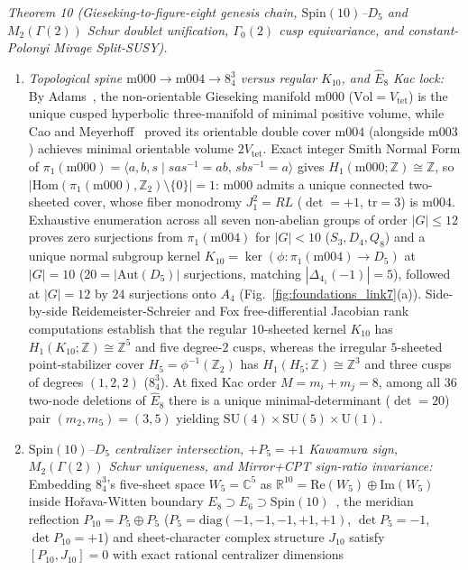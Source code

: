 \documentclass[aps,prd,twocolumn,nofootinbib,floatfix]{revtex4-2}
\begin{document}
\emph{Theorem 10 (Gieseking-to-figure-eight genesis chain, $\mathrm{Spin}(10)$--$D_5$ and $M_2(\Gamma(2))$ Schur doublet unification, $\Gamma_0(2)$ cusp equivariance, and constant-Polonyi Mirage Split-SUSY).}
\begin{enumerate}
    \item \emph{Topological spine $\mathrm{m000} \to \mathrm{m004} \to 8^3_4$ versus regular $K_{10}$, and $\widehat{E}_8$ Kac lock:} By Adams~\cite{Adams1987}, the non-orientable Gieseking manifold $\mathrm{m000}$ ($\mathrm{Vol} = V_{\mathrm{tet}}$) is the unique cusped hyperbolic three-manifold of minimal positive volume, while Cao and Meyerhoff~\cite{CaoMeyerhoff2001} proved its orientable double cover $\mathrm{m004}$ (alongside $\mathrm{m003}$) achieves minimal orientable volume $2V_{\mathrm{tet}}$. Exact integer Smith Normal Form of $\pi_1(\mathrm{m000}) = \langle a,b,s \mid sas^{-1}=ab,\,sbs^{-1}=a\rangle$ gives $H_1(\mathrm{m000};\mathbb{Z}) \cong \mathbb{Z}$, so $|\mathrm{Hom}(\pi_1(\mathrm{m000}),\mathbb{Z}_2)\setminus\{0\}| = 1$: $\mathrm{m000}$ admits a unique connected two-sheeted cover, whose fiber monodromy $J_1^2 = RL$ ($\det = +1$, $\mathrm{tr} = 3$) is $\mathrm{m004}$. Exhaustive enumeration across all seven non-abelian groups of order $|G| \le 12$ proves zero surjections from $\pi_1(\mathrm{m004})$ for $|G| < 10$ ($S_3, D_4, Q_8$) and a unique normal subgroup kernel $K_{10} = \ker(\phi: \pi_1(\mathrm{m004}) \to D_5)$ at $|G| = 10$ ($20 = |\mathrm{Aut}(D_5)|$ surjections, matching $|\Delta_{4_1}(-1)| = 5$), followed at $|G| = 12$ by $24$ surjections onto $A_4$ (Fig.~\ref{fig:foundations_link7}(a)). Side-by-side Reidemeister-Schreier and Fox free-differential Jacobian rank computations establish that the regular $10$-sheeted kernel $K_{10}$ has $H_1(K_{10};\mathbb{Z}) \cong \mathbb{Z}^5$ and five degree-$2$ cusps, whereas the irregular $5$-sheeted point-stabilizer cover $H_5 = \phi^{-1}(\mathbb{Z}_2)$ has $H_1(H_5;\mathbb{Z}) \cong \mathbb{Z}^3$ and three cusps of degrees $(1,2,2)$ ($8^3_4$). At fixed Kac order $M = m_i + m_j = 8$, among all $36$ two-node deletions of $\widehat{E}_8$ there is a unique minimal-determinant ($\det = 20$) pair $(m_2, m_5) = (3,5)$ yielding $\mathrm{SU}(4)\times\mathrm{SU}(5)\times\mathrm{U}(1)$.
    \item \emph{$\mathrm{Spin}(10)$--$D_5$ centralizer intersection, $+P_5 = +1$ Kawamura sign, $M_2(\Gamma(2))$ Schur uniqueness, and Mirror+CPT sign-ratio invariance:} Embedding $8^3_4$'s five-sheet space $W_5 = \mathbb{C}^5$ as $\mathbb{R}^{10} = \mathrm{Re}(W_5)\oplus\mathrm{Im}(W_5)$ inside Ho\v{r}ava-Witten boundary $E_8 \supset E_6 \supset \mathrm{Spin}(10)$~\cite{HoravaWitten1996}, the meridian reflection $P_{10} = P_5\oplus P_5$ ($P_5 = \mathrm{diag}(-1,-1,-1,+1,+1)$, $\det P_5 = -1$, $\det P_{10} = +1$) and sheet-character complex structure $J_{10}$ satisfy $[P_{10}, J_{10}] = 0$ with exact rational centralizer dimensions

\end{enumerate}
\end{document}
